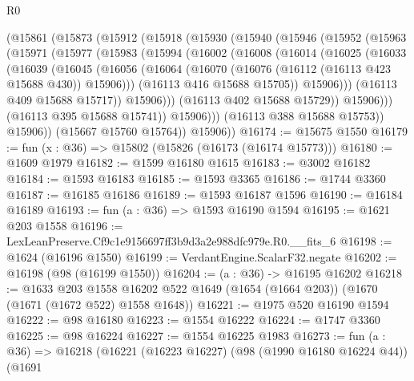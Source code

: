 \begin{lexlean}{R0}
\begin{coremodule}
      (@15861
        (@15873
          (@15912
            (@15918
              (@15930
                (@15940
                  (@15946
                    (@15952
                      (@15963
                        (@15971
                          (@15977
                            (@15983
                              (@15994
                                (@16002
                                  (@16008
                                    (@16014
                                      (@16025
                                        (@16033
                                          (@16039
                                            (@16045
                                              (@16056
                                                (@16064
                                                  (@16070
                                                    (@16076
                                                      (@16112 (@16113 @423 @15688 @430))
                                                      @15906)))
                                                (@16113 @416 @15688 @15705))
                                              @15906)))
                                        (@16113 @409 @15688 @15717))
                                      @15906)))
                                (@16113 @402 @15688 @15729))
                              @15906)))
                        (@16113 @395 @15688 @15741))
                      @15906)))
                (@16113 @388 @15688 @15753))
              @15906))
          (@15667 @15760 @15764))
        @15906))
@16174 := @15675 @1550
@16179 := fun (x : @36) => @15802 (@15826 (@16173 (@16174 @15773)))
@16180 := @1609 @1979
@16182 := @1599 @16180 @1615
@16183 := @3002 @16182
@16184 := @1593 @16183
@16185 := @1593 @3365
@16186 := @1744 @3360
@16187 := @16185 @16186
@16189 := @1593 @16187 @1596
@16190 := @16184 @16189
@16193 := fun (a : @36) => @1593 @16190 @1594
@16195 := @1621 @203 @1558
@16196 := LexLeanPreserve.Cf9c1e9156697ff3b9d3a2e988dfc979e.R0.__fits_6
@16198 := @1624 (@16196 @1550)
@16199 := VerdantEngine.ScalarF32.negate
@16202 := @16198 (@98 (@16199 @1550))
@16204 := (a : @36) -> @16195 @16202
@16218 := @1633
    @203
    @1558
    @16202
    @522
    @1649
    (@1654 (@1664 @203))
    (@1670 (@1671 (@1672 @522) @1558 @1648))
@16221 := @1975 @520 @16190 @1594
@16222 := @98 @16180
@16223 := @1554 @16222
@16224 := @1747 @3360
@16225 := @98 @16224
@16227 := @1554 @16225 @1983
@16273 := fun (a : @36) =>
  @16218
    (@16221
      (@16223 @16227)
      (@98 (@1990 @16180 @16224 @44))
      (@1691

\end{coremodule}
\end{lexlean}
